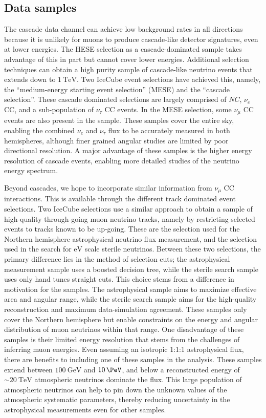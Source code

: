 \subsection{Data samples}
The cascade data channel can achieve low background rates in all directions because it is unlikely for muons to produce cascade-like detector signatures, even at lower energies.
The HESE selection as a cascade-dominated sample takes advantage of this in part but cannot cover lower energies.
Additional selection techniques can obtain a high purity sample of cascade-like neutrino events that extends down to $\SI{1}\TeV$.
Two IceCube event selections have achieved this, namely, the ``medium-energy starting event selection'' (MESE) and the ``cascade selection''.
These cascade dominated selections are largely comprised of $NC$, $\nu_e$ CC, and a sub-population of $\nu_\tau$ CC events.
In the MESE selection, some $\nu_\mu$ CC events are also present in the sample.
These samples cover the entire sky, enabling the combined $\nu_e$ and $\nu_\tau$ flux to be accurately measured in both hemispheres, although finer grained angular studies are limited by poor directional resolution.
A major advantage of these samples is the higher energy resolution of cascade events, enabling more detailed studies of the neutrino energy spectrum.

Beyond cascades, we hope to incorporate similar information from $\nu_\mu$ CC interactions.
This is available through the different track dominated event selections.
Two IceCube selections use a similar approach to obtain a sample of high-quality through-going muon neutrino tracks, namely by restricting selected events to tracks known to be up-going.
These are the selection used for the Northern hemisphere astrophysical neutrino flux measurement, and the selection used in the search for $\si\eV$ scale sterile neutrinos.
Between these two selections, the primary difference lies in the method of selection cuts; the astrophysical measurement sample uses a boosted decision tree, while the sterile search sample uses only hand tunes straight cuts.
This choice stems from a difference in motivation for the samples.
The astrophysical sample aims to maximize effective area and angular range, while the sterile search sample aims for the high-quality reconstruction and maximum data-simulation agreement.
These samples only cover the Northern hemisphere but enable constraints on the energy and angular distribution of muon neutrinos within that range.
One disadvantage of these samples is their limited energy resolution that stems from the challenges of inferring muon energies.
Even assuming an isotropic 1:1:1 astrophysical flux, there are benefits to including one of these samples in the analysis.
These samples extend between $\SI{100}\GeV$ and $\SI{10}\PeV$, and below a reconstructed energy of $\sim\SI{20}\TeV$ atmospheric neutrinos dominate the flux.
This large population of atmospheric neutrinos can help to pin down the unknown values of the atmospheric systematic parameters, thereby reducing uncertainty in the astrophysical measurements even for other samples.


